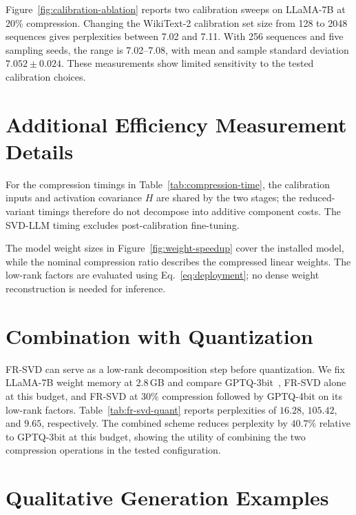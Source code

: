 Figure~\ref{fig:calibration-ablation} reports two calibration sweeps on LLaMA-7B at 20\% compression. Changing the WikiText-2 calibration set size from 128 to 2048 sequences gives perplexities between 7.02 and 7.11. With 256 sequences and five sampling seeds, the range is 7.02--7.08, with mean and sample standard deviation $7.052\pm0.024$. These measurements show limited sensitivity to the tested calibration choices.

\section{Additional Efficiency Measurement Details}\label{app:efficiency}



For the compression timings in Table~\ref{tab:compression-time}, the calibration inputs and activation covariance $H$ are shared by the two stages; the reduced-variant timings therefore do not decompose into additive component costs. The SVD-LLM timing excludes post-calibration fine-tuning.

The model weight sizes in Figure~\ref{fig:weight-speedup} cover the installed model, while the nominal compression ratio describes the compressed linear weights. The low-rank factors are evaluated using Eq.~\eqref{eq:deployment}; no dense weight reconstruction is needed for inference.

\section{Combination with Quantization}\label{app:quantization}
FR-SVD can serve as a low-rank decomposition step before quantization. We fix LLaMA-7B weight memory at $2.8$\,GB and compare GPTQ-3bit~\citep{frantar2023gptq}, FR-SVD alone at this budget, and FR-SVD at $30\%$ compression followed by GPTQ-4bit on its low-rank factors. Table~\ref{tab:fr-svd-quant} reports perplexities of $16.28$, $105.42$, and $9.65$, respectively. The combined scheme reduces perplexity by $40.7\%$ relative to GPTQ-3bit at this budget, showing the utility of combining the two compression operations in the tested configuration.



\section{Qualitative Generation Examples}\label{app:qualitative}

